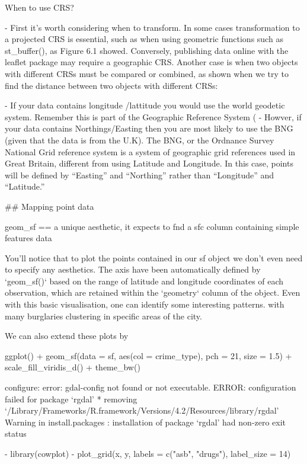 \documentclass[12pt]{article}
\begin{document}
When to use CRS?

- First it’s worth considering when to transform. In some cases transformation to a projected CRS is essential, such as when using geometric functions such as st_buffer(), as Figure 6.1 showed. Conversely, publishing data online with the leaflet package may require a geographic CRS. Another case is when two objects with different CRSs must be compared or combined, as shown when we try to find the distance between two objects with different CRSs:


- If your data contains longitude /lattitude you would use the world geodetic system. Remember this is part of the Geographic Reference System (
- Howver, if your data contains Northings/Easting then you are most likely to use the BNG (given that the data is from the U.K). The BNG, or the Ordnance Survey National Grid reference system is a system of geographic grid references used in Great Britain, different from using Latitude and Longitude. In this case, points will be defined by “Easting” and “Northing” rather than “Longitude” and “Latitude.” 





## Mapping point data 

geom_sf ==  a unique aesthetic, it expects to fnd a sfc column containing simple features data

You'll notice that to plot the points contained in our sf object we don't even need to specify any aesthetics. The axis have been automatically defined by `geom_sf()` based on the range of latitude and longitude coordinates of each observation, which are retained within the `geometry` column of the object. Even with this basic visualisation, one can identify some interesting patterns. with many burglaries clustering in specific areas of the city.


We can also extend these plots by 

ggplot() + 
  geom_sf(data = sf, aes(col = crime_type), pch = 21, size = 1.5) +
  scale_fill_viridis_d() + 
  theme_bw()


configure: error: gdal-config not found or not executable.
ERROR: configuration failed for package ‘rgdal’
* removing ‘/Library/Frameworks/R.framework/Versions/4.2/Resources/library/rgdal’
Warning in install.packages :
  installation of package ‘rgdal’ had non-zero exit status



- library(cowplot)
- plot_grid(x, y, labels = c("asb", "drugs"), label_size = 14)
\end{document}
